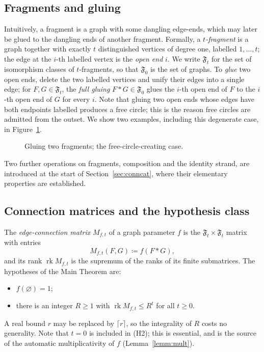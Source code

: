 \documentclass[11pt]{article}
\newcommand{\emptygraph}{\varnothing}
\newcommand{\Frag}[1]{\mathfrak{F}_{#1}}          %
\newcommand{\connmat}[2]{M_{#1,#2}}               %
\newcommand{\glue}{\ast}                          %
\newcommand{\rk}{\operatorname{rk}}
\begin{document}
\subsection{Fragments and gluing}\label{subsec:fragments}

Intuitively, a fragment is a graph with some dangling edge-ends, which
may later be glued to the dangling ends of another fragment.
Formally, a \emph{$t$-fragment} is a graph together with exactly $t$
distinguished vertices of degree one, labelled $1,\dotsc,t$; the edge
at the $i$-th labelled vertex is the \emph{open end} $i$. We write
$\Frag{t}$ for the set of isomorphism classes of $t$-fragments, so
that $\Frag{0}$ is the set of graphs. To \emph{glue} two open ends,
delete the two labelled vertices and unify their edges into a single
edge; for $F,G\in\Frag{t}$, the \emph{full gluing}
$F\glue G\in\Frag{0}$ glues the $i$-th open end of $F$ to the $i$-th
open end of $G$ for every $i$. Note that gluing two open ends whose
edges have both endpoints labelled produces a free circle; this is
the reason free circles are admitted from the outset. We show two
examples, including this degenerate case, in
Figure~\ref{fig:gluing}.

\begin{figure}
\centering

\caption{Gluing two fragments; the free-circle-creating case.}
\label{fig:gluing}
\end{figure}

Two further operations on fragments, composition and the identity
strand, are introduced at the start of Section~\ref{sec:conncat},
where their elementary properties are established.

\subsection{Connection matrices and the hypothesis
class}\label{subsec:connmat}

The \emph{edge-connection matrix} $\connmat{f}{t}$ of a graph
parameter $f$ is the $\Frag{t}\times\Frag{t}$ matrix with entries
\[
\connmat{f}{t}(F,G)\coloneqq f(F\glue G),
\]
and its rank $\rk\connmat{f}{t}$ is the supremum of the ranks of its
finite submatrices. The hypotheses of the Main Theorem are:
\begin{itemize}
\item[(H1)] $f(\emptygraph)=1$;
\item[(H2)] there is an integer $R\ge 1$ with
  $\rk\connmat{f}{t}\le R^{t}$ for all $t\ge 0$.
\end{itemize}
A real bound $r$ may be replaced by $\lceil r\rceil$, so the
integrality of $R$ costs no generality. Note that $t=0$ is included
in (H2); this is essential, and is the source of the automatic
multiplicativity of $f$ (Lemma~\ref{lemm:mult}).
\end{document}
